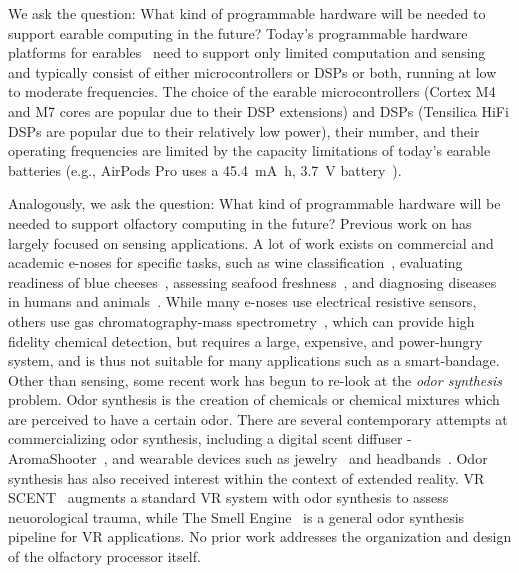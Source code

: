 
We ask the question: What kind of programmable hardware will be needed to
support earable computing in the future?  Today's programmable hardware
platforms for earables~\cite{} need to support only limited computation and
sensing and typically consist of either microcontrollers or DSPs or both,
running at low to moderate frequencies. The choice of the earable
microcontrollers (Cortex M4 and M7 cores are popular due to their DSP
extensions) and DSPs (Tensilica HiFi DSPs are popular due to their relatively
low power), their number, and their operating frequencies are limited by the
capacity limitations of today's earable batteries (e.g., AirPods Pro uses a
\SI{45.4}{\milli\ampere\hour}, \SI{3.7}{\volt} battery~\cite{}).

Analogously, we ask the question: What kind of programmable hardware will be needed to
support olfactory computing in the future?
Previous work on \olfc{} has largely focused on sensing applications. A lot of
work exists on commercial and academic e-noses for specific tasks, such as wine
classification~\cite{buratti2004characterization}, evaluating readiness of blue
cheeses~\cite{valente2018cheeses}, assessing seafood freshness~\cite{grassi2022seafood}, and
diagnosing diseases in humans and animals~\cite{gardner2000electronic,
binson2021discrimination, va2021noninvasive, d2010investigation}.  While many
e-noses use electrical resistive sensors, others use gas chromatography-mass
spectrometry~\cite{electronic_sensor_technology, alpha_2018, pan2014early},
which can provide high fidelity chemical detection, but requires a large,
expensive, and power-hungry system, and is thus not suitable for many \olfc{}
applications such as a smart-bandage.
Other than sensing, some recent work has begun to re-look at the \textit{odor
synthesis} problem.%
Odor synthesis is the creation of
chemicals or chemical mixtures which are perceived to have a certain odor.
There are several contemporary attempts at commercializing odor synthesis,
including a digital scent diffuser - AromaShooter~\cite{aromajoin_corporation},
and wearable devices such as jewelry~\cite{tillotson2006scent} and
headbands~\cite{amores2018promoting}. Odor synthesis has also received interest
within the context of extended reality.  VR SCENT~\cite{olorama_technology}
augments a standard VR system with odor synthesis to assess neuorological
trauma, while The Smell Engine~\cite{bahremand2022smell} is a general odor
synthesis pipeline for VR applications.
No prior work addresses
the organization and design of the olfactory processor itself.


